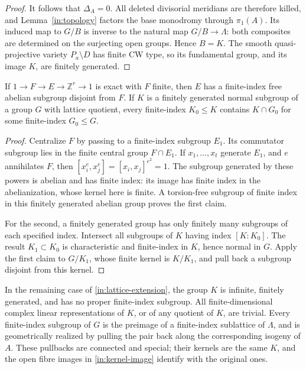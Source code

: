\begin{proof}
It follows that \(\Delta_A=0\).  All deleted divisorial meridians
are therefore killed, and Lemma~\ref{in:topology} factors the base
monodromy through \(\pi_1(A)\).  Its induced map to \(G/B\) is
inverse to the natural map \(G/B\to\Lambda\): both composites
are determined on the surjecting open groups.  Hence \(B=K\).
The smooth quasi-projective variety \(P_a\setminus D\) has finite
CW type, so its fundamental group, and its image \(K\), are
finitely generated.
\end{proof}

\begin{lemma}\label{in:finite-by-lattice}
If \(1\to F\to E\to\mathbb Z^r\to1\) is exact with \(F\) finite,
then \(E\) has a finite-index free abelian subgroup disjoint from
\(F\).  If \(K\) is a finitely generated normal subgroup of a group
\(G\) with lattice quotient, every finite-index \(K_0\le K\)
contains \(K\cap G_0\) for some finite-index \(G_0\le G\).
\end{lemma}

\begin{proof}
Centralize \(F\) by passing to a finite-index subgroup \(E_1\).
Its commutator subgroup lies in the finite central group
\(F\cap E_1\).  If \(x_1,\ldots,x_t\) generate \(E_1\), and
\(e\) annihilates \(F\), then
\([x_i^e,x_j^e]=[x_i,x_j]^{e^2}=1\).  The subgroup generated by
these powers is abelian and has finite index: its image has finite
index in the abelianization, whose kernel here is finite.  A
torsion-free subgroup of finite index in this finitely generated
abelian group proves the first claim.

For the second, a finitely generated group has only finitely many
subgroups of each specified index.  Intersect all subgroups of
\(K\) having index \([K:K_0]\).  The result \(K_1\subset K_0\)
is characteristic and finite-index in \(K\), hence normal in
\(G\).  Apply the first claim to \(G/K_1\), whose finite kernel
is \(K/K_1\), and pull back a subgroup disjoint from this kernel.
\end{proof}

\begin{proposition}
\label{in:group-reduction}
In the remaining case of \eqref{in:lattice-extension}, the group
\(K\) is infinite, finitely generated, and has no proper
finite-index subgroup.  All finite-dimensional complex linear
representations of \(K\), or of any quotient of \(K\), are trivial.
Every finite-index subgroup of \(G\) is the preimage of a
finite-index sublattice of \(\Lambda\), and is geometrically
realized by pulling the pair back along the corresponding
isogeny of \(A\).  These pullbacks are connected and special;
their kernels are the same \(K\), and the open fibre images in
\eqref{in:kernel-image} identify with the original ones.
\end{proposition}

